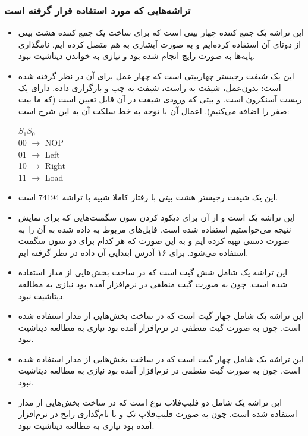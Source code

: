 \documentclass{article}
\begin{document}
\subsubsection{تراشه‌هایی که مورد استفاده قرار گرفته است}
\label{chips}
\begin{itemize}
\item[\lr{74283}]
این تراشه یک جمع کننده چهار بیتی است که برای ساخت یک جمع کننده هشت بیتی از دوتای آن استفاده کرده‌ایم و به صورت آبشاری به هم متصل کرده ایم. نامگذاری پایه‌ها به صورت رایج انجام شده بود و نیازی به خواندن دیتاشیت نبود.

\item[\lr{74194}]
این یک شیفت رجیستر چهاربیتی است که چهار عمل برای آن در نظر گرفته شده است: بدون‌عمل، شیفت به راست، شیفت به چپ و بارگزاری داده. دارای یک ریست آسنکرون است. و بیتی که ورودی شیفت در آن قابل تعیین است (که ما بیت صفر را اضافه می‌کنیم). اعمال آن با توجه به خط سلکت آن به این شرح است:

\begin{latin}
$S_1 S_0$\\
00 $\rightarrow$ NOP\\
01 $\rightarrow$ Left \\
10 $\rightarrow$ Right\\
11 $\rightarrow$ Load 
\end{latin}
\item[\lr{74198}]
این یک شیفت رجیستر هشت بیتی با رفتار کاملا شبیه با تراشه 74194 است.

\item[\lr{2732}] این تراشه یک 
است و از آن برای دیکود کردن سون سگمنت‌هایی که برای نمایش نتیجه می‌خواستیم استفاده شده است. فایل‌های مربوط به داده شده به آن را به صورت دستی تهیه کرده ایم و به این صورت که هر کدام برای دو سون سگمنت استفاده می‌شود. برای ۱۶ آدرس ابتدایی آن داده در نظر گرفته ایم.

\item[\lr{7404}] این تراشه یک شامل شش گیت  است که در ساخت بخش‌هایی از مدار استفاده شده است. چون به صورت گیت منطقی در نرم‌افزار آمده بود نیازی به مطالعه دیتاشیت نبود.

\item[\lr{7408}] این تراشه یک شامل چهار گیت  است که در ساخت بخش‌هایی از مدار استفاده شده است. چون به صورت گیت منطقی در نرم‌افزار آمده بود نیازی به مطالعه دیتاشیت نبود.

\item[\lr{7432}]  این تراشه یک شامل چهار گیت  است که در ساخت بخش‌هایی از مدار استفاده شده است. چون به صورت گیت منطقی در نرم‌افزار آمده بود نیازی به مطالعه دیتاشیت نبود.

\item[\lr{7474}]  این تراشه یک شامل دو فلیپ‌فلاپ نوع   است که در ساخت بخش‌هایی از مدار استفاده شده است. چون به صورت فلیپ‌فلاپ تک و با نام‌گذاری رایج در نرم‌افزار آمده بود نیازی به مطالعه دیتاشیت نبود.
\end{itemize}
\end{document}
